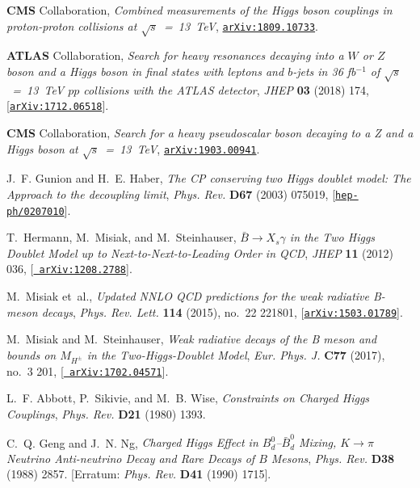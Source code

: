 \documentclass[review]{elsarticle}
\begin{document}
\begin{thebibliography}{100}
{\bf CMS} Collaboration, {\it {Combined measurements of the Higgs boson
  couplings in proton-proton collisions at $\sqrt{s}$~=~13~TeV}},  \href{http://arxiv.org/abs/1809.10733}{{\tt arXiv:1809.10733}}.

{\bf ATLAS} Collaboration, {\it {Search for heavy resonances
  decaying into a $W$ or $Z$ boson and a Higgs boson in final states with
  leptons and $b$-jets in 36 fb$^{-1}$ of $\sqrt s$~=~13~TeV $pp$ collisions
  with the ATLAS detector}},  {\em JHEP} {\bf 03} (2018) 174,
  [\href{http://arxiv.org/abs/1712.06518}{{\tt arXiv:1712.06518}}].
  
{\bf CMS} Collaboration,  {\it {Search for a heavy
  pseudoscalar boson decaying to a Z and a Higgs boson at $\sqrt{s}$~=~13~TeV}},
   \href{http://arxiv.org/abs/1903.00941}{{\tt arXiv:1903.00941}}.  

J.~F. Gunion and H.~E. Haber, {\it {The CP conserving two Higgs doublet model:
  The Approach to the decoupling limit}},  {\em Phys. Rev.} {\bf D67} (2003)
  075019, [\href{http://arxiv.org/abs/hep-ph/0207010}{{\tt hep-ph/0207010}}].

T.~Hermann, M.~Misiak, and M.~Steinhauser, {\it {$\bar{B}\to X_s \gamma$ in the
  Two Higgs Doublet Model up to Next-to-Next-to-Leading Order in QCD}},  {\em
  JHEP} {\bf 11} (2012) 036, [\href{http://arxiv.org/abs/1208.2788}{{\tt
  arXiv:1208.2788}}].

M.~Misiak et~al., {\it {Updated NNLO QCD predictions for the weak radiative
  B-meson decays}},  {\em Phys. Rev. Lett.} {\bf 114} (2015), no.~22 221801,
  [\href{http://arxiv.org/abs/1503.01789}{{\tt arXiv:1503.01789}}].

M.~Misiak and M.~Steinhauser, {\it {Weak radiative decays of the B meson and
  bounds on $M_{H^\pm }$ in the Two-Higgs-Doublet Model}},  {\em Eur. Phys. J.}
  {\bf C77} (2017), no.~3 201, [\href{http://arxiv.org/abs/1702.04571}{{\tt
  arXiv:1702.04571}}].

L.~F. Abbott, P.~Sikivie, and M.~B. Wise, {\it {Constraints on Charged Higgs
  Couplings}},  {\em Phys. Rev.} {\bf D21} (1980) 1393.

C.~Q. Geng and J.~N. Ng, {\it {Charged Higgs Effect in $B_d^0$--$\bar B_d^0$
  Mixing, $K \to \pi$ Neutrino Anti-neutrino Decay and Rare Decays of $B$
  Mesons}},  {\em Phys. Rev.} {\bf D38} (1988) 2857. [Erratum: {\it Phys. Rev.}
  {\bf D41} (1990) 1715].


\end{thebibliography}
\end{document}
